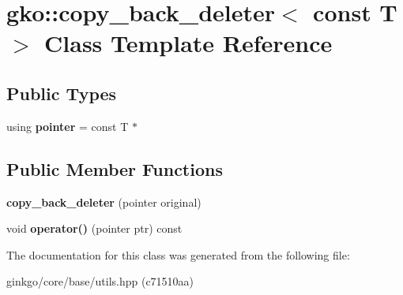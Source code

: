 \hypertarget{classgko_1_1copy__back__deleter_3_01const_01T_01_4}{}\section{gko\+:\+:copy\+\_\+back\+\_\+deleter$<$ const T $>$ Class Template Reference}
\label{classgko_1_1copy__back__deleter_3_01const_01T_01_4}
\subsection*{Public Types}
\begin{DoxyCompactItemize}
\item 
\mbox{\label{classgko_1_1copy__back__deleter_3_01const_01T_01_4_ac97aced5ec2b913d1b2ed864852c7e7a}} 
using {\bfseries pointer} = const T $\ast$
\end{DoxyCompactItemize}
\subsection*{Public Member Functions}
\begin{DoxyCompactItemize}
\item 
\mbox{\label{classgko_1_1copy__back__deleter_3_01const_01T_01_4_a5df23aa81eb300213916238b9bf93507}} 
{\bfseries copy\+\_\+back\+\_\+deleter} (pointer original)
\item 
\mbox{\label{classgko_1_1copy__back__deleter_3_01const_01T_01_4_a040c2d22121f60c491e3b6e65f399248}} 
void {\bfseries operator()} (pointer ptr) const
\end{DoxyCompactItemize}


The documentation for this class was generated from the following file\+:\begin{DoxyCompactItemize}
\item 
ginkgo/core/base/utils.\+hpp (c71510aa)\end{DoxyCompactItemize}
